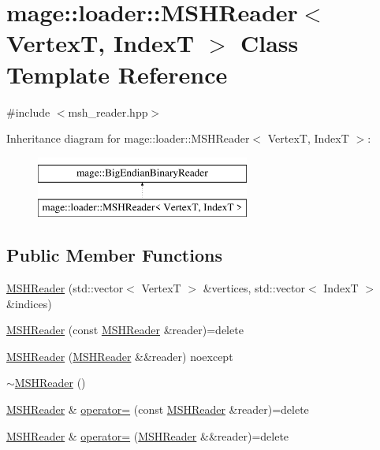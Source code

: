 \hypertarget{classmage_1_1loader_1_1_m_s_h_reader}{}\section{mage\+:\+:loader\+:\+:M\+S\+H\+Reader$<$ VertexT, IndexT $>$ Class Template Reference}
\label{classmage_1_1loader_1_1_m_s_h_reader}


{\ttfamily \#include $<$msh\+\_\+reader.\+hpp$>$}

Inheritance diagram for mage\+:\+:loader\+:\+:M\+S\+H\+Reader$<$ VertexT, IndexT $>$\+:\begin{figure}[H]
\begin{center}
\leavevmode
\includegraphics[height=2.000000cm]{classmage_1_1loader_1_1_m_s_h_reader}
\end{center}
\end{figure}
\subsection*{Public Member Functions}
\begin{DoxyCompactItemize}
\item 
\hyperlink{classmage_1_1loader_1_1_m_s_h_reader_aba90bcecc8c6c515cb5de1aaf90b1afe}{M\+S\+H\+Reader} (std\+::vector$<$ VertexT $>$ \&vertices, std\+::vector$<$ IndexT $>$ \&indices)
\item 
\hyperlink{classmage_1_1loader_1_1_m_s_h_reader_a9f4ebf50f4b17a4269ff99bfd5c96585}{M\+S\+H\+Reader} (const \hyperlink{classmage_1_1loader_1_1_m_s_h_reader}{M\+S\+H\+Reader} \&reader)=delete
\item 
\hyperlink{classmage_1_1loader_1_1_m_s_h_reader_a32644c53ec25e716d4d9a3387b94f2c3}{M\+S\+H\+Reader} (\hyperlink{classmage_1_1loader_1_1_m_s_h_reader}{M\+S\+H\+Reader} \&\&reader) noexcept
\item 
\hyperlink{classmage_1_1loader_1_1_m_s_h_reader_a7176387987a85f7d5560b50f5aff7a43}{$\sim$\+M\+S\+H\+Reader} ()
\item 
\hyperlink{classmage_1_1loader_1_1_m_s_h_reader}{M\+S\+H\+Reader} \& \hyperlink{classmage_1_1loader_1_1_m_s_h_reader_a4bff04c1c970cf2a5d54e3412e41bc07}{operator=} (const \hyperlink{classmage_1_1loader_1_1_m_s_h_reader}{M\+S\+H\+Reader} \&reader)=delete
\item 
\hyperlink{classmage_1_1loader_1_1_m_s_h_reader}{M\+S\+H\+Reader} \& \hyperlink{classmage_1_1loader_1_1_m_s_h_reader_a351f1e1c310ff472b454f3bb5d5b8fe9}{operator=} (\hyperlink{classmage_1_1loader_1_1_m_s_h_reader}{M\+S\+H\+Reader} \&\&reader)=delete
\end{DoxyCompactItemize}
